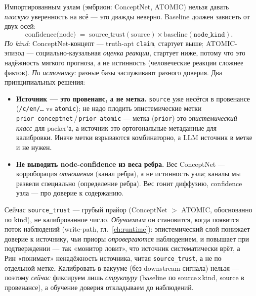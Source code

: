 \begin{principle}[Confidence приора $=$ source\_trust $\times$ kind, а не плоская константа]
Импортированным узлам (эмбрион: ConceptNet, ATOMIC) нельзя давать \emph{плоскую} уверенность
на всё — это дважды неверно. Baseline должен зависеть от двух осей:
\[
\text{confidence(node)} \;=\; \text{source\_trust}(\text{source}) \times \text{baseline}(\texttt{node\_kind}).
\]
\emph{По kind}: ConceptNet-концепт — truth-apt \texttt{claim}, стартует выше;
ATOMIC-эпизод — социально-каузальная \emph{оценка реакции}, стартует ниже, потому что это
надёжность мягкого прогноза, а не истинность (человеческие реакции сложнее фактов).
\emph{По источнику}: разные базы заслуживают разного доверия. Два принципиальных решения:
\begin{itemize}\itemsep2pt
\item \textbf{Источник — это провенанс, а не метка.} \texttt{source} уже несётся в
провенансе (\texttt{/c/en/\dots} vs \texttt{atomic}); не надо плодить эпистемические метки
\texttt{prior\_conceptnet}\,/\,\texttt{prior\_atomic} — метка (\texttt{prior}) это
\emph{эпистемический класс} для packer'а, а источник это ортогональные метаданные для
калибровки. Иначе метки взрываются комбинаторно, а LLM источник в метке и не нужен.
\item \textbf{Не выводить node-confidence из веса ребра.} Вес ConceptNet — корроборация
\emph{отношения} (канал ребра), а не истинность узла; каналы мы развели специально
(определение ребра). Вес гонит диффузию, confidence узла — про доверие к содержанию.
\end{itemize}
\end{principle}

\begin{openq}
Сейчас \texttt{source\_trust} — грубый прайор (ConceptNet $>$ ATOMIC, обоснованно по kind),
не калиброванное число. \emph{Обучаемым} он становится, когда появится поток наблюдений
(write-path, гл.~\ref{ch:runtime}): эпистемический слой понижает доверие к источнику, чьи
приоры \emph{опровергаются} наблюдением, и повышает при подтверждении — так «монитор ловит»,
что источник систематически врёт, а Рин «понимает» ненадёжность источника, читая
\texttt{source\_trust}, а не по отдельной метке. Калибровать в вакууме (без downstream-сигнала)
нельзя — поэтому \emph{сейчас} фиксируем лишь \emph{структуру} (baseline по source$\times$kind,
source в провенансе), а обучение доверия откладываем до наблюдений.
\end{openq}

